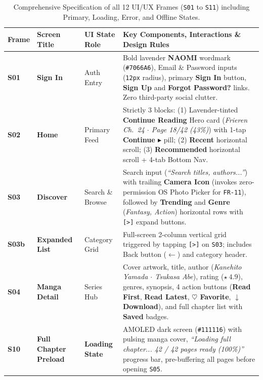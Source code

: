 \begin{table}[H]
\centering
\caption{Comprehensive Specification of all 12 UI/UX Frames (\texttt{S01} to \texttt{S11}) including Primary, Loading, Error, and Offline States.}
\label{tab:screen_catalog}
\scriptsize
\renewcommand{\arraystretch}{1.24}
\begin{tabularx}{\textwidth}{C{1.1cm} L{2.8cm} C{2.1cm} Y}
\toprule
{}
\textbf{Frame} & \textbf{Screen Title} & \textbf{UI State Role} & \textbf{Key Components, Interactions \& Design Rules} \\
\midrule
\textbf{S01} & \textbf{Sign In} & Auth Entry & Bold lavender \textbf{NAOMI} wordmark (\texttt{\#7066A6}), Email \& Password inputs (\texttt{12px} radius), primary \textbf{Sign In} button, \textbf{Sign Up} and \textbf{Forgot Password?} links. Zero third-party social clutter. \\
\textbf{S02} & \textbf{Home} & Primary Feed & Strictly 3 blocks: (1) Lavender-tinted \textbf{Continue Reading} Hero card (\textit{Frieren Ch.\ 24 $\cdot$ Page 18/42 (43\%)}) with 1-tap \textbf{Continue $\blacktriangleright$} pill; (2) \textbf{Recent} horizontal scroll; (3) \textbf{Recommended} horizontal scroll + 4-tab Bottom Nav. \\
\textbf{S03} & \textbf{Discover} & Search \& Browse & Search input (\textit{``Search titles, authors...''}) with trailing \textbf{Camera Icon} (invokes zero-permission OS Photo Picker for \texttt{FR-11}), followed by \textbf{Trending} and \textbf{Genre} (\textit{Fantasy, Action}) horizontal rows with \texttt{[>]} expand buttons. \\
\textbf{S03b} & \textbf{Expanded List} & Category Grid & Full-screen 2-column vertical grid triggered by tapping \texttt{[>]} on \texttt{S03}; includes Back button (\texttt{$\leftarrow$}) and category header. \\
\textbf{S04} & \textbf{Manga Detail} & Series Hub & Cover artwork, title, author (\textit{Kanehito Yamada $\cdot$ Tsukasa Abe}), rating ($\star\ 4.9$), genres, synopsis, 4 action buttons (\textbf{Read First}, \textbf{Read Latest}, \textbf{$\heartsuit$ Favorite}, \textbf{$\downarrow$ Download}), and full chapter list with \textbf{Saved} badges. \\
\textbf{S10} & \textbf{Full Chapter Preload} & \textbf{Loading State} & AMOLED dark screen (\texttt{\#111116}) with pulsing manga cover, \textit{``Loading full chapter... 42 / 42 pages ready (100\%)''} progress bar, pre-buffering all pages before opening \texttt{S05}. \\

\end{tabularx}
\end{table}
